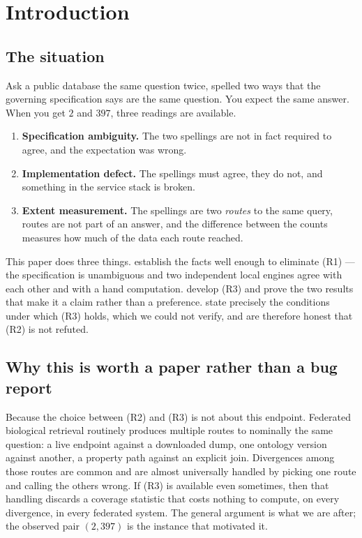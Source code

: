 \documentclass[11pt,a4paper]{article}
\theoremstyle{plain}
\theoremstyle{definition}
\theoremstyle{remark}
\begin{document}
\tableofcontents

\section{Introduction}
\label{sec:intro}

\subsection{The situation}

Ask a public database the same question twice, spelled two ways that the
governing specification says are the same question. You expect the same answer.
When you get $2$ and $397$, three readings are available.

\begin{enumerate}[label=(R\arabic*),leftmargin=3em]
\item \textbf{Specification ambiguity.} The two spellings are not in fact
required to agree, and the expectation was wrong.
\item \textbf{Implementation defect.} The spellings must agree, they do not, and
something in the service stack is broken.
\item \textbf{Extent measurement.} The spellings are two \emph{routes} to the
same query, routes are not part of an answer, and the difference between the
counts measures how much of the data each route reached.
\end{enumerate}

This paper does three things.  establish the
facts well enough to eliminate (R1) --- the specification is unambiguous and two
independent local engines agree with each other and with a hand computation.
 develop (R3) and prove the two
results that make it a claim rather than a preference.
 state precisely the conditions under which (R3)
holds, which we could not verify, and are therefore honest that (R2) is not
refuted.

\subsection{Why this is worth a paper rather than a bug report}

Because the choice between (R2) and (R3) is not about this endpoint. Federated
biological retrieval routinely produces multiple routes to nominally the same
question: a live endpoint against a downloaded dump, one ontology version
against another, a property path against an explicit join. Divergences among
those routes are common and are almost universally handled by picking one route
and calling the others wrong. If (R3) is available even sometimes, then that
handling discards a coverage statistic that costs nothing to compute, on every
divergence, in every federated system. The general argument is what we are
after; the observed pair $(2,397)$ is the instance that motivated it.
\end{document}
